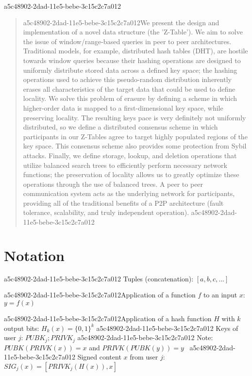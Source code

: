 \documentclass[12pt]{article}
\begin{document}
\maketitle
a5c48902-2dad-11e5-bebe-3c15c2c7a012
\begin{abstract}
a5c48902-2dad-11e5-bebe-3c15c2c7a012We present the design and implementation of a novel data structure (the 'Z-Table'). We aim to solve the issue of window/range-based queries in peer to peer architectures. Traditional models, for example,  distributed hash tables (DHT), are hostile towards window queries because their hashing operations are designed to uniformly distribute stored data across a defined key space; the hashing operations used to achieve this pseudo-random distribution inherently erases all characteristics of the target data that could be used to define locality. We solve this problem of erasure by defining a scheme in which higher-order data is mapped to a first-dimensional key space, while preserving locality. The resulting keys pace is very definitely not uniformly distributed, so we define a distributed consensus scheme in which participants in our Z-Tables agree to target highly populated regions of the key space. This consensus scheme also provides some protection from Sybil attacks. Finally, we define storage, lookup, and deletion operations that utilize balanced search trees to efficiently perform necessary network functions; the preservation of locality allows us to greatly optimize these operations through the use of balanced trees. A peer to peer communication system acts as the underlying network for participants, providing all of the traditional benefits of a P2P architecture (fault tolerance, scalability, and truly independent operation).
a5c48902-2dad-11e5-bebe-3c15c2c7a012\end{abstract}

\section{Notation}
a5c48902-2dad-11e5-bebe-3c15c2c7a012
Tuples (concatenation): $[a,b,c,...]$

a5c48902-2dad-11e5-bebe-3c15c2c7a012Application of a function $f$ to an input $x$: $y=f(x)$

a5c48902-2dad-11e5-bebe-3c15c2c7a012Application of a hash function $H$ with $k$ output bits: $H_{k}(x) = \{0,1\}^k$
a5c48902-2dad-11e5-bebe-3c15c2c7a012
Keys of user $j$: $ PUBK_j; PRIVK_j $
a5c48902-2dad-11e5-bebe-3c15c2c7a012
Note: $PUBK(PRIVK(x)) = x$ and $PRIVK(PUBK(y)) = y$~
a5c48902-2dad-11e5-bebe-3c15c2c7a012
Signed content $x$ from user $j$: $SIG_j(x) = \left[ PRIVK_j( H(x) ), x \right]$
\end{document}
